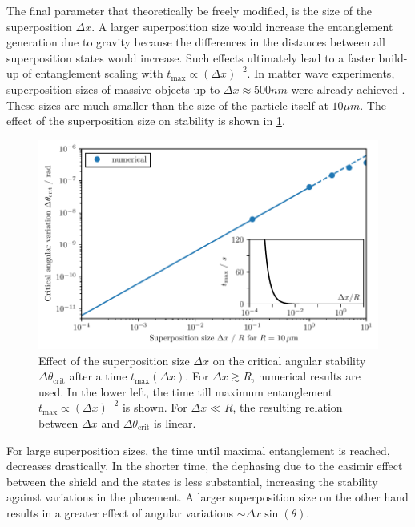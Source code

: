 The final parameter that theoretically be freely modified, is the size of the superposition $\Delta x$. A larger superposition size would increase the entanglement generation due to gravity because the differences in the distances between all superposition states would increase. Such effects ultimately lead to a faster build-up of entanglement scaling with $t_\mathrm{max} \propto (\Delta x)^{-2}$.
In matter wave experiments, superposition sizes of massive objects up to $\Delta x \approx 500\si{nm}$ were already achieved \cite{Fein_2019}.
These sizes are much smaller than the size of the particle itself at $10\si{\mu m}$.
The effect of the superposition size on stability is shown in \cref{fig:4:theta-crit-superposition-size}.
\begin{figure}[!htbp]
  \centering
  \includegraphics[width=\textwidth]{./../figures/theta-variance/theta-crit-superpos-size.pdf}
  \caption{Effect of the superposition size $\Delta x$ on the critical angular stability $\Delta \theta_\mathrm{crit}$ after a time $t_\mathrm{max}(\Delta x)$. For $\Delta x \gtrsim R$, numerical results are used. In the lower left, the time till maximum entanglement $t_\mathrm{max} \propto (\Delta x)^{-2}$ is shown. For $\Delta x \ll R$, the resulting relation between $\Delta x$ and $\Delta \theta_\mathrm{crit}$ is linear.}
  \label{fig:4:theta-crit-superposition-size}
\end{figure}
For large superposition sizes, the time until maximal entanglement is reached, decreases drastically. In the shorter time, the dephasing due to the casimir effect between the shield and the states is less substantial, increasing the stability against variations in the placement.
A larger superposition size on the other hand results in a greater effect of angular variations $\sim \Delta x \sin(\theta)$.
